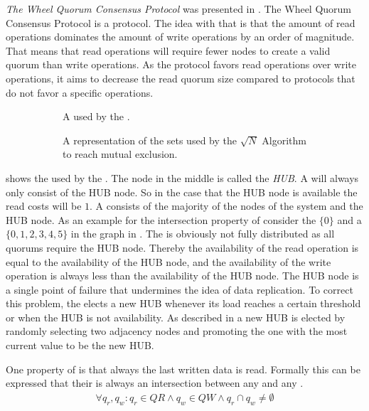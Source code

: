 \documentclass[conference]{IEEEtran}
\begin{document}
\emph{The Wheel Quorum Consensus Protocol} was presented in
\cite{pa:2014:novel}.
The Wheel Quorum Consensus Protocol is a  protocol.
The idea with that is that the amount of read operations dominates the amount
of write operations by an order of magnitude.
That means that read operations will require fewer nodes to create a valid
quorum than write operations.
As the protocol favors read operations over write operations, it aims to
decrease the read quorum size compared to protocols that do not favor a
specific operations.
\begin{figure}[ht]
	\begin{subfigure}[t]{0.48\linewidth}
		
		\caption{A  used by the .}
		\label{fig:wheel}
	\end{subfigure}
	\begin{subfigure}[t]{0.48\linewidth}
			
		\caption{A representation of the sets used by the \(\sqrt{N}\) Algorithm
			to reach mutual exclusion.}
		\label{fig:nsqrt}
	\end{subfigure}
	\caption{}
\end{figure}
 shows the  used by the .
The node in the middle is called the \emph{HUB}.
A  will always only consist of the HUB node.
So in the case that the HUB node is available the read costs will be \(1\).
A  consists of the majority of the nodes of the system and the HUB node.
As an example for the intersection property of  consider the
 \(\{0\}\) and a  \(\{0,1,2,3,4,5\}\) in the graph in
.
The  is obviously not fully distributed as all quorums require
the HUB node.
Thereby the availability of the read operation is equal to the availability of
the HUB node, and the availability of the write operation is always less than
the availability of the HUB node.
The HUB node is a single point of failure that undermines the idea of data
replication.
To correct this problem, the  elects a new HUB whenever its load
reaches a certain threshold or when the HUB is not availability.
As described in \cite{pa:2014:novel} a new HUB is elected by randomly
selecting two adjacency nodes and promoting the one with the most current
value to be the new HUB.
\begin{theorem}
\label{thm:wheelprotocolisnotocs}
One property of  is that always the last written data is read.
Formally this can be expressed that their is always an intersection between
any  and any .
\begin{align}
	\forall q_r, q_w : q_r \in QR \wedge q_w \in QW \wedge q_r \cap q_w \ne
	\emptyset
\end{align}
\end{theorem}
\end{document}
